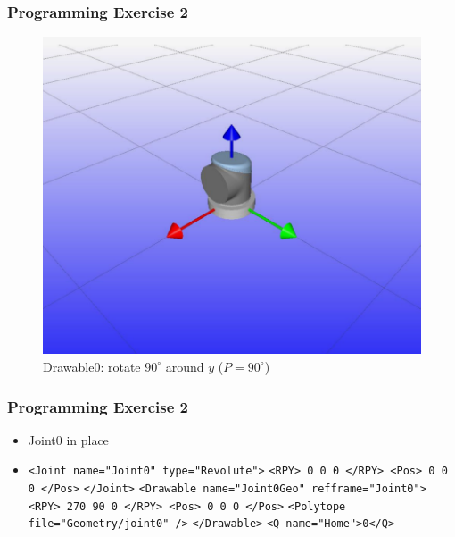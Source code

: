 \documentclass{beamer}
\begin{document}

\begin{frame}
  \frametitle{Programming Exercise 2}
  \begin{centering}
    \begin{figure}
    \includegraphics[height=0.6\textheight]{./graphics/ex33_6}
    \caption{Drawable0: rotate $90^{\circ}$ around $y$ ($P=90^{\circ}$)}
    \end{figure}
    \end{centering}
  \end{frame}
  

\begin{frame}
  \frametitle{Programming Exercise 2}
  \begin{itemize}
  \item Joint0 in place
    \item \texttt{<Joint name="Joint0" type="Revolute">} \newline
      \texttt{<RPY> 0 0 0 </RPY> <Pos> 0 0 0 </Pos>} \newline
      \texttt{</Joint>} \newline
      \texttt{<Drawable name="Joint0Geo" refframe="Joint0">}\newline
      \texttt{<RPY> 270 90 0 </RPY> <Pos> 0 0 0 </Pos>}\newline
      \texttt{<Polytope file="Geometry/joint0" />}\newline
      \texttt{</Drawable>} \newline
      \texttt{<Q name="Home">0</Q>}
  \end{itemize}
\end{frame}
\end{document}
